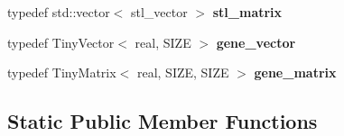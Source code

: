 \begin{DoxyCompactItemize}
typedef std\+::vector$<$ stl\+\_\+vector $>$ {\bfseries stl\+\_\+matrix}
\item 
\mbox{\label{classtiny__blitz__interface_a7dea9c47f25a2261a2c50188a53ae325}} 
typedef Tiny\+Vector$<$ real, S\+I\+ZE $>$ {\bfseries gene\+\_\+vector}
\item 
\mbox{\label{classtiny__blitz__interface_a60f0848fb179cd855f521f07eeadc13e}} 
typedef Tiny\+Matrix$<$ real, S\+I\+ZE, S\+I\+ZE $>$ {\bfseries gene\+\_\+matrix}
\end{DoxyCompactItemize}
\subsection*{Static Public Member Functions}
